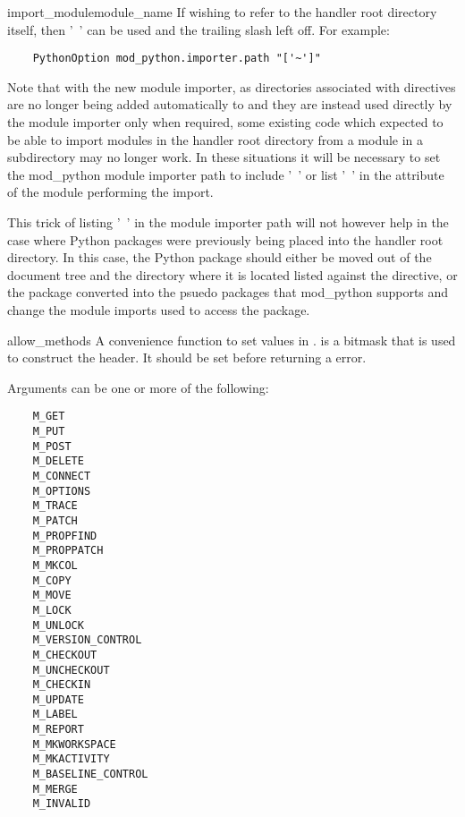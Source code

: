 \begin{funcdesc}{import_module}{module_name}
  If wishing to refer to the handler root directory itself, then '~' can be
  used and the trailing slash left off. For example:

  \begin{verbatim}
    PythonOption mod_python.importer.path "['~']"
  \end{verbatim}

  Note that with the new module importer, as directories associated with
   directives are no longer being added automatically
  to  and they are instead used directly by the module
  importer only when required, some existing code which expected to be able
  to import modules in the handler root directory from a module in a
  subdirectory may no longer work. In these situations it will be necessary
  to set the mod_python module importer path to include '~' or list '~' in
  the  attribute of the module performing the import.

  This trick of listing '~' in the module importer path will not however
  help in the case where Python packages were previously being placed into
  the handler root directory. In this case, the Python package should
  either be moved out of the document tree and the directory where it is
  located listed against the  directive, or the package
  converted into the psuedo packages that mod_python supports and change
  the module imports used to access the package.

\end{funcdesc}

\begin{funcdesc}{allow_methods}{}
  A convenience function to set values in .
   is a bitmask that is used to construct the
   header. It should be set before returning a
   error.

  Arguments can be one or more of the following:
  \begin{verbatim}
    M_GET
    M_PUT
    M_POST
    M_DELETE
    M_CONNECT
    M_OPTIONS
    M_TRACE
    M_PATCH
    M_PROPFIND
    M_PROPPATCH
    M_MKCOL
    M_COPY
    M_MOVE
    M_LOCK
    M_UNLOCK
    M_VERSION_CONTROL
    M_CHECKOUT
    M_UNCHECKOUT
    M_CHECKIN
    M_UPDATE
    M_LABEL
    M_REPORT
    M_MKWORKSPACE
    M_MKACTIVITY
    M_BASELINE_CONTROL
    M_MERGE
    M_INVALID
  \end{verbatim}

\end{funcdesc}

